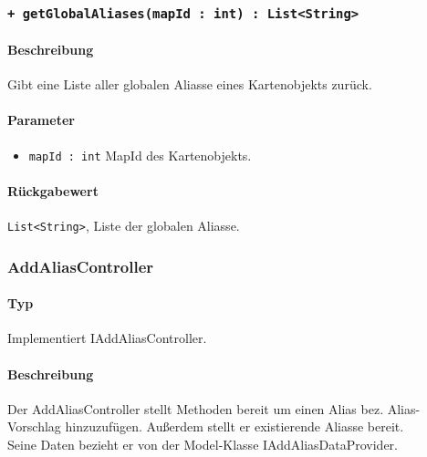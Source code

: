 \subsubsection*{\texttt{+ getGlobalAliases(mapId : int) : List<String>}}%
\paragraph*{Beschreibung}
Gibt eine Liste aller globalen Aliasse eines Kartenobjekts zurück.
\paragraph*{Parameter}
\begin{itemize}
    \item \texttt{mapId : int} MapId des Kartenobjekts.
\end{itemize}
\paragraph*{Rückgabewert}
\texttt{List<String>}, Liste der globalen Aliasse.

\subsubsection{AddAliasController}
\paragraph*{Typ}
Implementiert IAddAliasController.
\paragraph*{Beschreibung}
Der AddAliasController stellt Methoden bereit um einen Alias bez. Alias-Vorschlag hinzuzufügen. 
Außerdem stellt er existierende Aliasse bereit.\\
Seine Daten bezieht er von der Model-Klasse IAddAliasDataProvider.